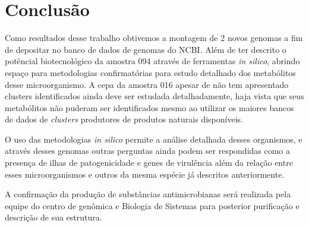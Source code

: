 \chapter{Conclusão}
\label{conclusao}

Como resultados desse trabalho obtivemos a montagem de 2 novos genomas a fim de depositar no banco
de dados de genomas do NCBI. Além de ter descrito o potêncial biotecnológico da amostra 094
através de ferramentas \textit{in silico}, abrindo espaço para metodologias confirmatórias para
estudo detalhado dos metabólitos desse microorganismo. A cepa da amostra 016 apesar de não tem apresentado
clusters identificados ainda deve ser estudada detalhadamente, haja vista que seus metabólitos não puderam
ser identificados mesmo ao utilizar os maiores bancos de dados de \textit{clusters} produtores de produtos naturais disponíveis.

O uso das metodologias \textit{in silico} permite a análise detalhada desses organismos, e através desses genomas
outras perguntas ainda  podem ser respondidas como a presença de ilhas de patogenicidade e genes de virulência
além da relação entre esses microorganismos e outros da mesma espécie já descritos anteriormente.

A confirmação da produção de substâncias antimicrobianas será realizada pela equipe do centro de genômica
e Biologia de Sistemas para posterior purificação e descrição de sua estrutura.
